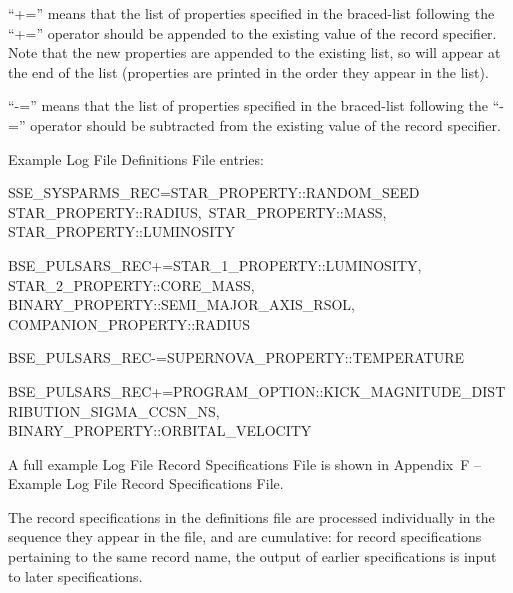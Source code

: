 \bigskip
\hfill
\begin{minipage}{\dimexpr\textwidth-1.5cm}
``+='' means that the list of properties specified in the braced-list following the ``+='' operator should be appended to the existing value of the record specifier. Note that the new properties are appended to the existing list, so will appear at the end of the list (properties are printed in the order they appear in the list).
\end{minipage}

\bigskip
\hfill
\begin{minipage}{\dimexpr\textwidth-1.5cm}
``-='' means that the list of properties specified in the braced-list following the ``-='' operator should be subtracted from the existing value of the record specifier.
\end{minipage}

\bigskip
Example Log File Definitions File entries:
\bigskip

\small
SSE\_SYSPARMS\_REC\tabto{9.65em}=\tabto{11em}\lcb\tabto{11.6em}STAR\_PROPERTY::RANDOM\_SEED \\
\tabto{11.6em}STAR\_PROPERTY::RADIUS,\ STAR\_PROPERTY::MASS,
\tabto{11.6em}STAR\_PROPERTY::LUMINOSITY\ \rcb

\medskip
BSE\_PULSARS\_REC\tabto{9em}+=\tabto{11em}\lcb\tabto{11.6em}STAR\_1\_PROPERTY::LUMINOSITY, \\
\tabto{11.6em}STAR\_2\_PROPERTY::CORE\_MASS, \\
\tabto{11.6em}BINARY\_PROPERTY::SEMI\_MAJOR\_AXIS\_RSOL, \\
\tabto{11.6em}COMPANION\_PROPERTY::RADIUS\ \rcb

\medskip
BSE\_PULSARS\_REC\tabto{9em}-=\tabto{11em}\lcb\tabto{11.6em}SUPERNOVA\_PROPERTY::TEMPERATURE\ \rcb

\medskip
BSE\_PULSARS\_REC\tabto{9em}+=\tabto{11em}\lcb\tabto{11.6em}PROGRAM\_OPTION::KICK\_MAGNITUDE\_DISTRIBUTION\_SIGMA\_CCSN\_NS,
\tabto{11.6em}BINARY\_PROPERTY::ORBITAL\_VELOCITY\ \rcb

\normalsize

\bigskip 
A full example Log File Record Specifications File is shown in Appendix~F -- Example Log File Record Specifications File.

The record specifications in the definitions file are processed individually in the sequence they appear in the file, and are cumulative: for record specifications pertaining to the same record name, the output of earlier specifications is input to later specifications.

